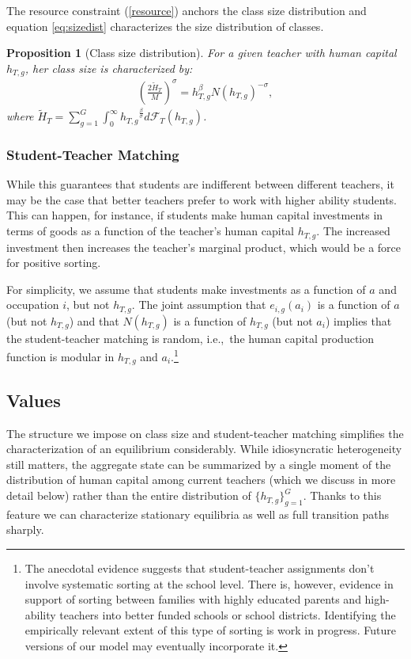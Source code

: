 \documentclass[onehalfspacing,11pt]{article}
\newtheorem{prp}{Proposition}
\begin{document}
	The resource constraint (\ref{resource}) anchors the class size distribution and equation \eqref{eq:sizedist} characterizes the size distribution of classes.
	\begin{prp}[Class size distribution] For a given teacher with human capital $h_{T,g}$, her class size is characterized by:
		\begin{align}
			\left(\frac{2\widetilde{H}_T}{M}\right)^\sigma=h_{T,g}^\beta N(h_{T,g})^{-\sigma},\label{eq:N(h)}
		\end{align}
		where $\widetilde{H}_T = \sum_{g=1}^G \int_0^\infty {h_{T,g}}^{\frac{\beta}{\sigma}} d\mathcal{F}_T(h_{T,g}) $.
	\end{prp}
	
	\subsubsection{Student-Teacher Matching}
	While this guarantees that students are indifferent between different teachers, it may be the case that better teachers prefer to work with higher ability students. This can happen, for instance, if students make human capital investments in terms of goods as a function of the teacher's human capital $h_{T,g}$. The increased investment then increases the teacher's marginal product, which would be a force for positive sorting.
	
	For simplicity, we assume that students make investments as a function of $a$ and occupation $i$, but not $h_{T,g}$. The joint assumption that $e_{i,g}(a_i)$ is a function of $a$ (but not $h_{T,g}$) and that $N(h_{T,g})$ is a function of $h_{T,g}$ (but not $a_i$) implies that the student-teacher matching is random, i.e.,~the human capital production function is modular in $h_{T,g}$ and $a_i$.\footnote{The anecdotal evidence suggests that student-teacher assignments don't involve systematic sorting at the school level. There is, however, evidence in support of sorting between families with highly educated parents and high-ability teachers into better funded schools or school districts. Identifying the empirically relevant extent of this type of sorting is work in progress. Future versions of our model may eventually incorporate it.}
	
	\subsection{Values}
	The structure we impose on class size and student-teacher matching simplifies the characterization of an equilibrium considerably. While idiosyncratic heterogeneity still matters, the aggregate state can be summarized by a single moment of the distribution of human capital among current teachers (which we discuss in more detail below) rather than the entire distribution of $\{ h_{T,g} \}_{g = 1}^G$. Thanks to this feature we can characterize stationary equilibria as well as full transition paths sharply.
	
\end{document}
